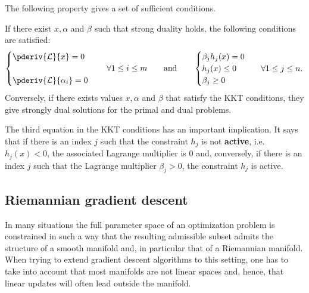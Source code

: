     The following property gives a set of sufficient conditions.
    \begin{property}\label{data:kkt}
        If there exist $x,\alpha$ and $\beta$ such that strong duality holds, the following conditions are satisfied:
        \begin{align}
            \begin{cases}
                \pderiv{\mathcal{L}}{x} = 0\\\\
                \pderiv{\mathcal{L}}{\alpha_i} = 0
            \end{cases}
            \quad\forall1\leq i\leq m \qquad\text{and}\qquad
            \begin{cases}
                \beta_jh_j(x) = 0\\
                h_j(x)\leq0&\quad\forall1\leq j\leq n.\\
                \beta_j\geq0
            \end{cases}
        \end{align}
        Conversely, if there exists values $x,\alpha$ and $\beta$ that satisfy the KKT conditions, they give strongly dual solutions for the primal and dual problems.
    \end{property}
    \begin{remark}\label{data:slackness}
        The third equation in the KKT conditions has an important implication. It says that if there is an index $j$ such that the constraint $h_j$ is not \textbf{active}, i.e.~$h_j(x)<0$, the associated Lagrange multiplier is 0 and, conversely, if there is an index $j$ such that the Lagrange multiplier $\beta_j>0$, the constraint $h_j$ is active.
    \end{remark}


\subsection{Riemannian gradient descent}

    In many situations the full parameter space of an optimization problem is constrained in such a way that the resulting admissible subset admits the structure of a smooth manifold and, in particular that of a Riemannian manifold. When trying to extend gradient descent algorithms to this setting, one has to take into account that most manifolds are not linear spaces and, hence, that linear updates will often lead outside the manifold.

